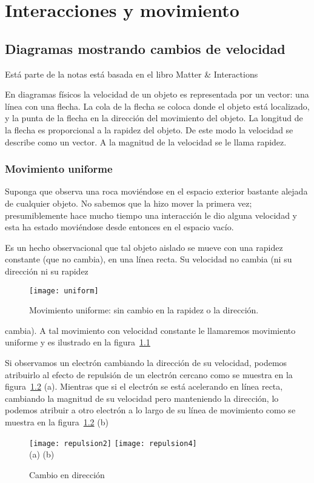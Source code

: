 \chapter{Interacciones y movimiento}

 
\section{Diagramas mostrando cambios de velocidad}

Está parte de la notas está basada en el libro Matter \& Interactions \cite{MI}

En diagramas físicos la velocidad de un objeto es representada por un
vector: una línea con una flecha. La cola de la flecha se coloca donde
el objeto está localizado, y la punta de la flecha en la dirección del
movimiento del objeto. La longitud de la flecha es proporcional a la
rapidez del objeto. De este modo la velocidad se describe como un
vector. A la magnitud de la velocidad se le llama rapidez.

\subsection{Movimiento uniforme}
Suponga que observa una roca moviéndose en el espacio exterior
bastante alejada de cualquier objeto. No sabemos que la hizo mover la
primera vez; presumiblemente hace mucho tiempo una interacción le dio
alguna velocidad y esta ha estado moviéndose desde entonces en el
espacio vacío.

Es un hecho observacional que tal objeto aislado se mueve con una
rapidez constante (que no cambia), en una línea recta. Su velocidad no
cambia (ni su dirección ni su rapidez
\begin{figure}
  \centering
  \texttt{[image: uniform]}
  \caption{Movimiento uniforme: sin cambio en la rapidez o la dirección.}
  \label{fig:uniform}
\end{figure}
cambia). A tal movimiento con
velocidad constante le llamaremos movimiento uniforme y es ilustrado
en la figura~\ref{fig:uniform}

Si observamos un electrón cambiando la dirección de su velocidad,
podemos atribuirlo al efecto de repulsión de un electrón cercano como
se muestra en la figura~\ref{fig:repulsion2} (a). Mientras que si el
electrón se está acelerando en línea recta, cambiando la magnitud de
su velocidad pero manteniendo la dirección, lo podemos atribuir a otro
electrón a lo largo de su línea de movimiento como se muestra en la
figura~\ref{fig:repulsion2} (b)
\begin{figure}
  \centering
  \texttt{[image: repulsion2]} \texttt{[image: repulsion4]}\\
    (a) \hspace{5cm} (b)
  \caption{Cambio en dirección}
  \label{fig:repulsion2}
\end{figure}


